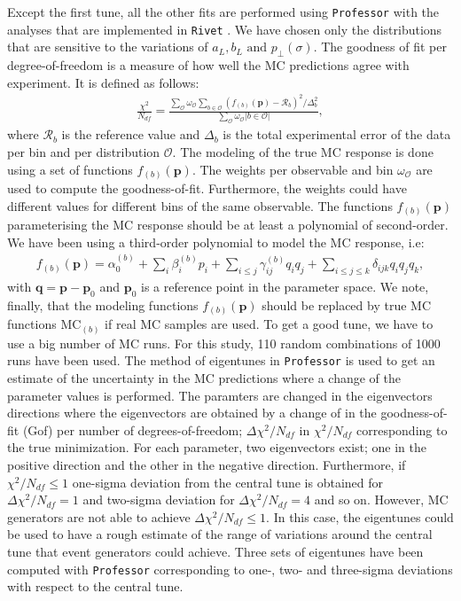 \documentclass[aps,preprint,floatfix,nofootinbib,showpacs]{revtex4-1}
\begin{document}
Except the first tune, all the other fits are performed using \texttt{Professor} \cite{Buckley:2009bj} with 
the analyses that are implemented in \texttt{Rivet} \cite{Buckley:2010ar}. We have 
chosen only the distributions that are sensitive to the variations 
of $a_L, b_L \text{ and } p_\perp(\sigma)$. The goodness of fit per 
degree-of-freedom is a measure of how well the MC predictions agree
with experiment. It is defined as follows:
\begin{eqnarray}
 \frac{\chi^2}{N_{df}} = \frac{\sum_{\mathcal{O}} 
 \omega_\mathcal{O} \sum_{b\in \mathcal{O}} (f_{(b)}(\textbf{p}) - \mathcal{R}_b)^2/\Delta_b^2}{\sum_{\mathcal{O}} \omega_\mathcal{O} |b \in \mathcal{O}|},
\label{Gof-Ndf}
 \end{eqnarray}
where $\mathcal{R}_b$ is the reference value and $\Delta_b$ is the total
experimental error of the data per bin and per distribution $\mathcal{O}$. The modeling
of the true MC response is done using a set of functions $f_{(b)}(\textbf{p})$. The weights
per observable and bin $\omega_\mathcal{O}$ are used to compute the goodness-of-fit. Furthermore,
the weights could have different values for different bins of the same observable. The functions
$f_{(b)}(\textbf{p})$ parameterising the MC response should be at least a polynomial of second-order.
We have been using a third-order polynomial to model the MC response, i.e:
\begin{eqnarray}
 f_{(b)}(\textbf{p}) = \alpha_0^{(b)} + \sum_i \beta_i^{(b)} p_i + \sum_{i \leq j} \gamma_{ij}^{(b)} q_i q_j +
 \sum_{i\leq j \leq k} \delta_{ijk} q_i q_j q_k,
 \label{MC-response}
\end{eqnarray}
with $\textbf{q} = \textbf{p} - \textbf{p}_0$ and $\textbf{p}_0$ is a reference point in the 
parameter space. We note, finally, that the modeling functions $f_{(b)}(\textbf{p})$ 
should be replaced by true MC functions $\text{MC}_{(b)}$ if real MC samples are used.
To get a good tune, we have to use a big number of MC runs. For this study, 110 random combinations
of 1000 runs have been used. 
The method of eigentunes in \texttt{Professor} is used to get an estimate of the 
uncertainty in the MC predictions where a change of the parameter values is 
performed. The paramters are changed in the eigenvectors directions where the 
eigenvectors are obtained by a change of in the goodness-of-fit (Gof) 
per number of degrees-of-freedom; 
$\Delta \chi^2/N_{df}$ in $\chi^2/N_{df}$ corresponding to the true minimization. 
For each parameter, two eigenvectors exist; one in the positive direction and the other 
in the negative direction. Furthermore, if $\chi^2/N_{df} \leq 1$ one-sigma deviation 
from the central tune is obtained for $\Delta \chi^2/N_{df} = 1$ and two-sigma deviation
for $\Delta \chi^2/N_{df} = 4$ and so on.
However, MC generators are not able to achieve $\Delta \chi^2/N_{df} \leq 1$. In this case,
the eigentunes could be used to have a rough estimate of the range of variations around
the central tune that event generators could achieve. Three sets of eigentunes have 
been computed with \texttt{Professor} corresponding to one-, two- and three-sigma deviations with 
respect to the central tune.
\end{document}
